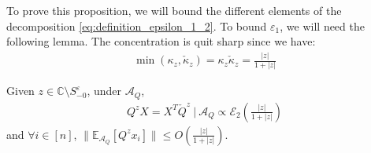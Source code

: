 \documentclass[a4papaer, titlepage]{book}
\begin{document}
To prove this proposition, we will bound the different elements of the decomposition \eqref{eq:definition_epsilon_1_2}. To bound $\varepsilon_1$, we will need the following lemma. The concentration is quit sharp since we have:
\begin{align*}
  \min(\kappa_z, \check \kappa_z) = \kappa_z \check \kappa_z = \frac{|z|}{1+|z|}
\end{align*}
\begin{lemma}\label{lem:concentration_QX_s_z}
  Given $z \in \mathbb C \setminus S_{-0}^\varepsilon$, under $\mathcal A_Q$,
  \begin{align*}
    Q^z X =  X^T \check Q^z \ |\ \mathcal A_Q \propto \mathcal E_2 \left( \frac{|z|}{1+|z|} \right)
  \end{align*}
  and $\forall i \in [n]$, $\|\mathbb E_ {\mathcal A_Q}[Q^zx_i]\| \leq O \left( \frac{|z|}{1+|z|} \right)$. 
\end{lemma}
\end{document}
